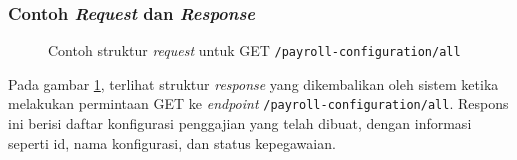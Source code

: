 \subsubsection{Contoh \textit{Request} dan \textit{Response}}
\begin{figure}
    \centering
    \caption{Contoh struktur \textit{request} untuk GET \texttt{/payroll-configuration/all}}
    \label{fig:response_payroll_configuration_all_get}
\end{figure}
Pada gambar \ref{fig:response_payroll_configuration_all_get}, terlihat struktur \textit{response} yang dikembalikan oleh sistem ketika melakukan permintaan GET ke \textit{endpoint} \texttt{/payroll-configuration/all}. Respons ini berisi daftar konfigurasi penggajian yang telah dibuat, dengan informasi seperti id, nama konfigurasi, dan status kepegawaian.


